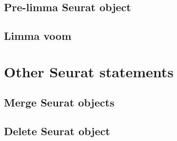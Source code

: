 \subsection{Pre-limma Seurat object}
\subsection{Limma voom}

\section{Other Seurat statements}
\subsection{Merge Seurat objects}
\subsection{Delete Seurat object}
